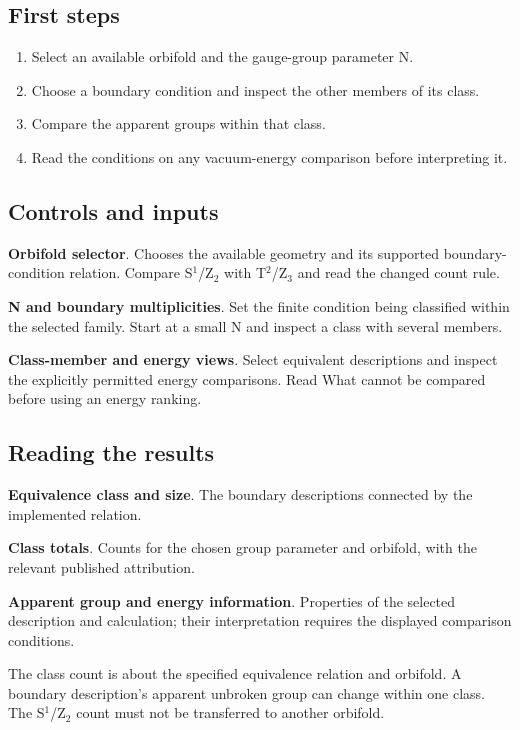 \documentclass[11pt,a4paper]{article}
\begin{document}
\subsection*{First steps}
\begin{enumerate}
\item Select an available orbifold and the gauge-group parameter N.
\item Choose a boundary condition and inspect the other members of its class.
\item Compare the apparent groups within that class.
\item Read the conditions on any vacuum-energy comparison before interpreting it.
\end{enumerate}
\subsection*{Controls and inputs}
\textbf{Orbifold selector}. Chooses the available geometry and its supported boundary-condition relation. Compare S\ensuremath{{}^{1}}/Z\ensuremath{{}_{2}} with T\ensuremath{{}^{2}}/Z\ensuremath{{}_{3}} and read the changed count rule.

\textbf{N and boundary multiplicities}. Set the finite condition being classified within the selected family. Start at a small N and inspect a class with several members.

\textbf{Class-member and energy views}. Select equivalent descriptions and inspect the explicitly permitted energy comparisons. Read What cannot be compared before using an energy ranking.

\subsection*{Reading the results}
\textbf{Equivalence class and size}. The boundary descriptions connected by the implemented relation.

\textbf{Class totals}. Counts for the chosen group parameter and orbifold, with the relevant published attribution.

\textbf{Apparent group and energy information}. Properties of the selected description and calculation; their interpretation requires the displayed comparison conditions.

The class count is about the specified equivalence relation and orbifold. A boundary description's apparent unbroken group can change within one class. The S\ensuremath{{}^{1}}/Z\ensuremath{{}_{2}} count must not be transferred to another orbifold.
\end{document}
